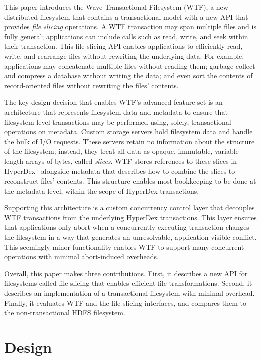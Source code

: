 \documentclass[twocolumn,10pt,letterpaper]{article}
\begin{document}
This paper introduces the Wave Transactional Filesystem (WTF), a new distributed
filesystem that contains a transactional model with a new API that provides {\em
file slicing} operations.  A WTF transaction may span multiple files and is
fully general; applications can include calls such as read, write, and seek
within their transaction.  This file slicing API enables applications to
efficiently read, write, and rearrange files without rewriting the underlying
data.  For example, applications may concatenate multiple files without reading
them; garbage collect and compress a database without writing the data; and even
sort the contents of record-oriented files without rewriting the files'
contents.

The key design decision that enables WTF's advanced feature set is an
architecture that represents filesystem data and metadata to ensure
that filesystem-level transactions may be performed using, solely, transactional
operations on metadata.  Custom storage servers hold filesystem data and handle
the bulk of I/O requests.  These servers retain no information about the
structure of the filesystem; instead, they treat all data as opaque, immutable,
variable-length arrays of bytes, called {\em slices}.  WTF stores references to
these slices in HyperDex~\cite{warp} alongside metadata that describes how to
combine the slices to reconstruct files' contents.  This structure enables most
bookkeeping to be done at the metadata level, within the scope of HyperDex
transactions.

Supporting this architecture is a custom concurrency control layer that
decouples WTF transactions from the underlying HyperDex transactions.  This
layer ensures that applications only abort when a concurrently-executing
transaction changes the filesystem in a way that generates an unresolvable,
application-visible conflict.  This seemingly minor functionality enables WTF to
support many concurrent operations with minimal abort-induced overheads.

Overall, this paper makes three contributions.  First, it describes a new API
for filesystems called file slicing that enables efficient file transformations.
Second, it describes an implementation of a transactional filesystem with
minimal overhead.  Finally, it evaluates WTF and the file slicing interfaces,
and compares them to the non-transactional HDFS filesystem.

\section{Design}
\end{document}
